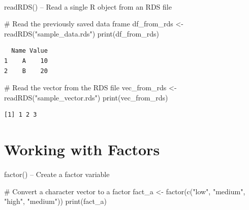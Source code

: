 \documentclass[
  letterpaper,
  DIV=11,
  numbers=noendperiod]{scrartcl}
\makeatletter
\let\oldparagraph\paragraph
\renewcommand{\paragraph}{
    \@ifstar
      \xxxParagraphStar
      \xxxParagraphNoStar
  }
\newcommand{\xxxParagraphStar}[1]{\oldparagraph*{#1}\mbox{}}
\newcommand{\xxxParagraphNoStar}[1]{\oldparagraph{#1}\mbox{}}
\newenvironment{Shaded}{\begin{snugshade}}{\end{snugshade}}
\newcommand{\CommentTok}[1]{\textcolor[rgb]{0.37,0.37,0.37}{#1}}
\newcommand{\FunctionTok}[1]{\textcolor[rgb]{0.28,0.35,0.67}{#1}}
\newcommand{\NormalTok}[1]{\textcolor[rgb]{0.00,0.23,0.31}{#1}}
\newcommand{\OtherTok}[1]{\textcolor[rgb]{0.00,0.23,0.31}{#1}}
\newcommand{\StringTok}[1]{\textcolor[rgb]{0.13,0.47,0.30}{#1}}
\makeatother
\begin{document}
\paragraph{readRDS() -- Read a single R object from an RDS
file}\label{readrds-read-a-single-r-object-from-an-rds-file}

\begin{Shaded}
\begin{Highlighting}[]
\CommentTok{\#   Read the previously saved data frame}
\NormalTok{df\_from\_rds }\OtherTok{\textless{}{-}} \FunctionTok{readRDS}\NormalTok{(}\StringTok{"sample\_data.rds"}\NormalTok{)}
\FunctionTok{print}\NormalTok{(df\_from\_rds)}
\end{Highlighting}
\end{Shaded}

\begin{verbatim}
  Name Value
1    A    10
2    B    20
\end{verbatim}

\begin{Shaded}
\begin{Highlighting}[]
\CommentTok{\#   Read the vector from the RDS file}
\NormalTok{vec\_from\_rds }\OtherTok{\textless{}{-}} \FunctionTok{readRDS}\NormalTok{(}\StringTok{"sample\_vector.rds"}\NormalTok{)}
\FunctionTok{print}\NormalTok{(vec\_from\_rds)}
\end{Highlighting}
\end{Shaded}

\begin{verbatim}
[1] 1 2 3
\end{verbatim}

\section{Working with Factors}\label{6-working-with-factors}

\paragraph{factor() -- Create a factor
variable}\label{factor-create-a-factor-variable}

\begin{Shaded}
\begin{Highlighting}[]
\CommentTok{\#   Convert a character vector to a factor}
\NormalTok{fact\_a }\OtherTok{\textless{}{-}} \FunctionTok{factor}\NormalTok{(}\FunctionTok{c}\NormalTok{(}\StringTok{"low"}\NormalTok{, }\StringTok{"medium"}\NormalTok{, }\StringTok{"high"}\NormalTok{, }\StringTok{"medium"}\NormalTok{))}
\FunctionTok{print}\NormalTok{(fact\_a)}
\end{Highlighting}
\end{Shaded}
\end{document}
